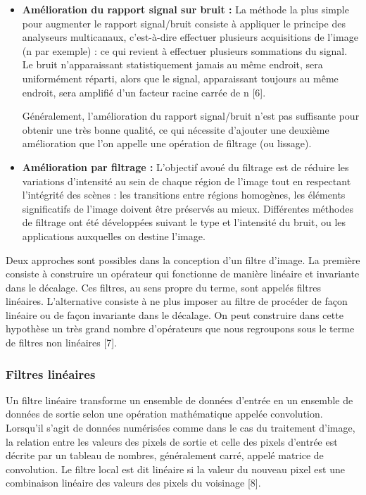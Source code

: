 \begin{itemize}
	\item \textbf{Amélioration du rapport signal sur bruit :} La méthode la plus simple pour augmenter le rapport signal/bruit consiste à appliquer le principe des analyseurs multicanaux, c'est-à-dire effectuer plusieurs acquisitions de l’image (n par exemple) : ce qui revient à effectuer plusieurs sommations du signal. Le bruit n’apparaissant statistiquement jamais au même endroit, sera uniformément réparti, alors que le signal, apparaissant toujours au même endroit, sera amplifié d’un facteur racine carrée de n [6].
	
	Généralement, l'amélioration du rapport signal/bruit n’est pas suffisante
	pour obtenir une très bonne qualité, ce qui nécessite d’ajouter une deuxième amélioration que l’on appelle une opération de filtrage (ou lissage).
	
	\item \textbf{Amélioration par filtrage :}
	L'objectif avoué du filtrage est de réduire les variations d'intensité au
	sein de chaque région de l'image tout en respectant l'intégrité des scènes :
	les transitions entre régions homogènes, les éléments significatifs de l'image	doivent être préservés au mieux. Différentes méthodes de filtrage ont été développées suivant le type et l’intensité du bruit, ou les applications auxquelles on destine l'image.
\end{itemize}

Deux approches sont possibles dans la conception d’un filtre d’image.
La première consiste à construire un opérateur qui fonctionne de manière
linéaire et invariante dans le décalage. Ces filtres, au sens propre du terme, sont appelés filtres linéaires. L'alternative consiste à ne plus imposer au filtre de procéder de façon linéaire ou de façon invariante dans le décalage. On peut construire dans cette hypothèse un très grand nombre d’opérateurs que nous regroupons sous le terme de filtres non linéaires [7].

\subsubsection{Filtres linéaires}
Un filtre linéaire transforme un ensemble de données d'entrée en un
ensemble de données de sortie selon une opération mathématique appelée
convolution. Lorsqu'il s'agit de données numérisées comme dans le cas du
traitement d'image, la relation entre les valeurs des pixels de sortie et celle des pixels d'entrée est décrite par un tableau de nombres, généralement
carré, appelé matrice de convolution. Le filtre local est dit linéaire si la valeur du nouveau pixel est une combinaison linéaire des valeurs des pixels du voisinage [8].

